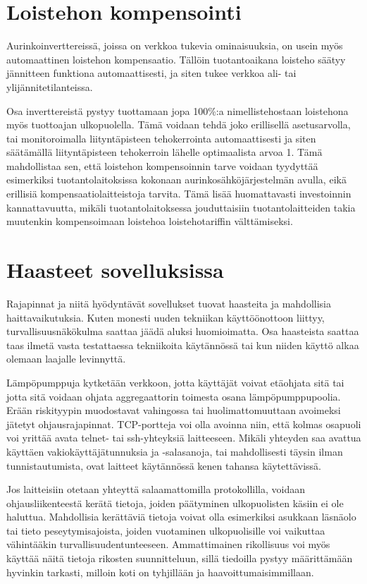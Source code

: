 \section{Loistehon kompensointi}
  Aurinkoinverttereissä, joissa on verkkoa tukevia ominaisuuksia, on usein myös automaattinen loistehon kompensaatio. Tällöin tuotantoaikana loisteho säätyy jännitteen funktiona automaattisesti, ja siten tukee verkkoa ali- tai ylijännitetilanteissa.

  Osa inverttereistä pystyy tuottamaan jopa 100\%:a nimellistehostaan loistehona myös tuottoajan ulkopuolella. Tämä voidaan tehdä joko erillisellä asetusarvolla, tai monitoroimalla liityntäpisteen tehokerrointa automaattisesti ja siten säätämällä liityntäpisteen tehokerroin lähelle optimaalista arvoa 1. Tämä mahdollistaa sen, että loistehon kompensoinnin tarve voidaan tyydyttää esimerkiksi tuotantolaitoksissa kokonaan aurinkosähköjärjestelmän avulla, eikä erillisiä kompensaatiolaitteistoja tarvita. Tämä lisää huomattavasti investoinnin kannattavuutta, mikäli tuotantolaitoksessa jouduttaisiin tuotantolaitteiden takia muutenkin kompensoimaan loistehoa loistehotariffin välttämiseksi.

\section{Haasteet sovelluksissa}

  Rajapinnat ja niitä hyödyntävät sovellukset tuovat haasteita ja mahdollisia haittavaikutuksia. Kuten monesti uuden tekniikan käyttöönottoon liittyy, turvallisuusnäkökulma saattaa jäädä aluksi huomioimatta. Osa haasteista saattaa taas ilmetä vasta testattaessa tekniikoita käytännössä tai kun niiden käyttö alkaa olemaan laajalle levinnyttä.

  Lämpöpumppuja kytketään verkkoon, jotta käyttäjät voivat etäohjata sitä tai jotta sitä voidaan ohjata aggregaattorin toimesta osana lämpöpumppupoolia. Erään riskityypin muodostavat vahingossa tai huolimattomuuttaan avoimeksi jätetyt ohjausrajapinnat. TCP-portteja voi olla avoinna niin, että kolmas osapuoli voi yrittää avata telnet- tai ssh-yhteyksiä laitteeseen. Mikäli yhteyden saa avattua käyttäen vakiokäyttäjätunnuksia ja -salasanoja, tai mahdollisesti täysin ilman tunnistautumista, ovat laitteet käytännössä kenen tahansa käytettävissä.

  Jos laitteisiin otetaan yhteyttä salaamattomilla protokollilla, voidaan ohjausliikenteestä kerätä tietoja, joiden päätyminen ulkopuolisten käsiin ei ole haluttua. Mahdollisia kerättäviä tietoja voivat olla esimerkiksi asukkaan läsnäolo tai tieto peseytymisajoista, joiden vuotaminen ulkopuolisille voi vaikuttaa vähintääkin turvallisuudentunteeseen. Ammattimainen rikollisuus voi myös käyttää näitä tietoja rikosten suunnitteluun, sillä tiedoilla pystyy määrittämään hyvinkin tarkasti, milloin koti on tyhjillään ja haavoittumaisimmillaan.

